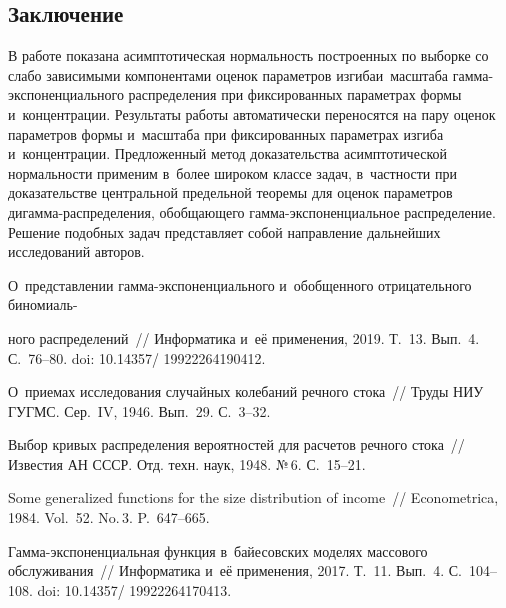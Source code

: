 \begin{multicols}{2}
\section{Заключение}


В работе показана асимптотическая нор\-маль\-ность по\-стро\-ен\-ных по выборке со слабо 
зависимыми компонентами оценок па\-ра\-мет\-ров изгиба\linebreak и~масштаба гам\-ма-экс\-по\-нен\-ци\-аль\-но\-го распре\-де\-ления при фиксированных 
па\-ра\-мет\-рах фор\-мы 
и~концентрации. Результаты работы автоматически переносятся на пару оценок 
па\-ра\-мет\-ров формы и~мас\-шта\-ба при фиксированных па\-ра\-мет\-рах изгиба и~концентрации. 
Предложенный метод доказательства асимп\-то\-ти\-че\-ской нор\-маль\-ности применим в~более 
широком классе задач, в~част\-ности при доказательстве цент\-раль\-ной предельной 
тео\-ре\-мы для оценок па\-ра\-мет\-ров ди\-гам\-ма-рас\-пре\-де\-ле\-ния, 
обобщающего гам\-ма-экс\-по\-нен\-ци\-аль\-ное рас\-пре\-де\-ле\-ние. Решение по\-доб\-ных задач пред\-став\-ля\-ет собой 
на\-прав\-ле\-ние дальнейших исследований авторов.

{\small\frenchspacing
 { %
 \begin{thebibliography}{99}
О~представлении гам\-ма-экс\-по\-нен\-ци\-аль\-но\-го и~обобщенного отрицательного 
биномиаль-\linebreak
\vspace*{-12pt}

\columnbreak

\noindent
ного распределений~// Информатика и~её применения, 2019. Т.~13. Вып.~4. С.~76--80.
doi: 10.14357/ 19922264190412.

О~приемах исследования случайных колебаний реч\-но\-го стока~// Труды НИУ ГУГМС. Сер.~IV, 1946. Вып.~29. С.~3--32. 

Выбор кривых рас\-пре\-де\-ле\-ния вероятностей для расчетов реч\-но\-го стока~// Известия АН СССР. Отд. техн. наук, 1948. №\,6. С.~15--21.

Some generalized functions for the size distribution of income~// Econometrica, 1984. Vol.~52. No.\,3. P.~647--665.

Гам\-ма-экс\-по\-нен\-ци\-аль\-ная функция в~байесовских моделях массового обслуживания~// Информатика и~её применения, 2017. Т.~11. Вып.~4. С.~104--108.
doi: 10.14357/ 19922264170413. 


\end{thebibliography}}}
\end{multicols}
